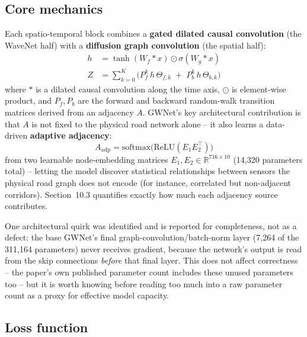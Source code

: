 \documentclass[11pt]{article}
\begin{document}
\subsection{Core mechanics}

Each spatio-temporal block combines a \textbf{gated dilated causal convolution} (the WaveNet
half) with a \textbf{diffusion graph convolution} (the spatial half):
\begin{align}
h &= \tanh(W_f * x) \odot \sigma(W_g * x) \\
Z &= \sum_{k=0}^{K} \Big( P_f^{k}\, h\, \Theta_{f,k} \;+\; P_b^{k}\, h\, \Theta_{b,k} \Big)
\end{align}
where $*$ is a dilated causal convolution along the time axis, $\odot$ is element-wise product,
and $P_f, P_b$ are the forward and backward random-walk transition matrices derived from an
adjacency $A$. GWNet's key architectural contribution is that $A$ is not fixed to the physical
road network alone -- it also learns a data-driven \textbf{adaptive adjacency}:
\begin{equation}
A_{\text{adp}} = \text{softmax}\big(\text{ReLU}(E_1 E_2^{\top})\big)
\end{equation}
from two learnable node-embedding matrices $E_1, E_2 \in \mathbb{R}^{716 \times 10}$ (14{,}320
parameters total) -- letting the model discover statistical relationships between sensors the
physical road graph does not encode (for instance, correlated but non-adjacent corridors).
Section~10.3 quantifies exactly how much each adjacency source contributes.

\begin{sowhat}
One architectural quirk was identified and is reported for completeness, not as a defect: the
base GWNet's final graph-convolution/batch-norm layer (7{,}264 of the 311{,}164 parameters) never
receives gradient, because the network's output is read from the skip connections \emph{before}
that final layer. This does not affect correctness -- the paper's own published parameter count
includes these unused parameters too -- but it is worth knowing before reading too much into a
raw parameter count as a proxy for effective model capacity.
\end{sowhat}

\subsection{Loss function}
\end{document}

